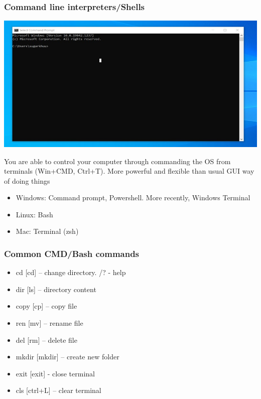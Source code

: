 \documentclass{beamer}
\begin{document}
\begin{frame}
    \frametitle{Command line interpreters/Shells}
    \centering
    \includegraphics[scale = 0.3]{figures/bash.jpg}

    You are able to control your computer through commanding
    the OS from terminals (Win+CMD, Ctrl+T). More powerful and flexible than usual GUI way of doing things \\

    \begin{itemize}
        \item Windows: Command prompt, Powershell. More recently, Windows Terminal \\
        \item Linux: Bash
        \item Mac: Terminal (zsh)
    \end{itemize}
\end{frame}

\begin{frame}
    \frametitle{Common CMD/Bash commands}
    \begin{itemize}
        \item cd [cd] – change directory. /? - help
        \item dir [ls] – directory content
        \item copy [cp] – copy file
        \item ren [mv] – rename file
        \item del [rm] – delete file
        \item mkdir [mkdir] – create new folder
        \item exit [exit] - close terminal
        \item cls [ctrl+L] – clear terminal
    \end{itemize}
\end{frame}
\end{document}
